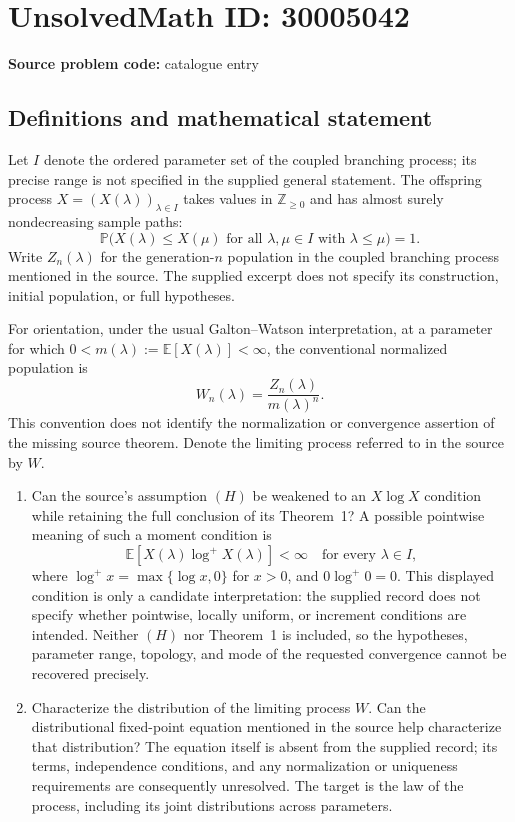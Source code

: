 \documentclass[11pt]{article}
\newcommand{\Z}{\mathbb{Z}}
\newcommand{\E}{\mathbb{E}}
\begin{document}
\section*{UnsolvedMath ID: 30005042}
\textbf{Source problem code:} catalogue entry
\subsection{Definitions and mathematical statement}
Let \(I\) denote the ordered parameter set of the coupled branching process; its precise range is not specified in the supplied general statement. The offspring process \(X=(X(\lambda))_{\lambda\in I}\) takes values in \(\Z_{\geq 0}\) and has almost surely nondecreasing sample paths:
\[
\mathbb P\bigl(X(\lambda)\leq X(\mu)\text{ for all }\lambda,\mu\in I\text{ with }\lambda\leq\mu\bigr)=1.
\]
Write \(Z_n(\lambda)\) for the generation-\(n\) population in the coupled branching process mentioned in the source. The supplied excerpt does not specify its construction, initial population, or full hypotheses.

For orientation, under the usual Galton--Watson interpretation, at a parameter for which \(0<m(\lambda):=\E[X(\lambda)]<\infty\), the conventional normalized population is
\[
W_n(\lambda)=\frac{Z_n(\lambda)}{m(\lambda)^n}.
\]
This convention does not identify the normalization or convergence assertion of the missing source theorem. Denote the limiting process referred to in the source by \(W\).

\begin{enumerate}
\item Can the source's assumption \((H)\) be weakened to an \(X\log X\) condition while retaining the full conclusion of its Theorem~1? A possible pointwise meaning of such a moment condition is
\[
\E\!\left[X(\lambda)\log^+X(\lambda)\right]<\infty
\quad\text{for every }\lambda\in I,
\]
where \(\log^+x=\max\{\log x,0\}\) for \(x>0\), and \(0\log^+0=0\). This displayed condition is only a candidate interpretation: the supplied record does not specify whether pointwise, locally uniform, or increment conditions are intended. Neither \((H)\) nor Theorem~1 is included, so the hypotheses, parameter range, topology, and mode of the requested convergence cannot be recovered precisely.
\item Characterize the distribution of the limiting process \(W\). Can the distributional fixed-point equation mentioned in the source help characterize that distribution? The equation itself is absent from the supplied record; its terms, independence conditions, and any normalization or uniqueness requirements are consequently unresolved. The target is the law of the process, including its joint distributions across parameters.
\end{enumerate}
\end{document}
